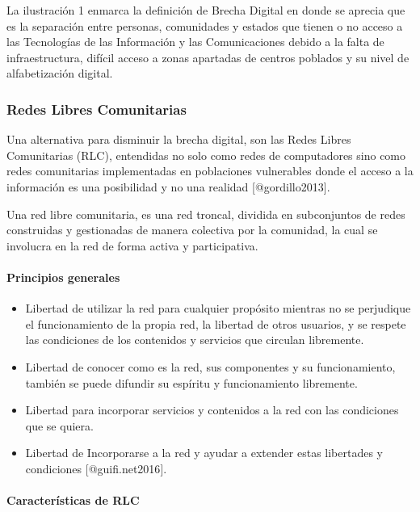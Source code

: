 \documentclass[]{article}
\let\oldparagraph\paragraph
\renewcommand{\paragraph}[1]{\oldparagraph{#1}\mbox{}}
\begin{document}
La ilustración 1 enmarca la definición de Brecha Digital en donde se
aprecia que es la separación entre personas, comunidades y estados que
tienen o no acceso a las Tecnologías de las Información y las
Comunicaciones debido a la falta de infraestructura, difícil acceso a
zonas apartadas de centros poblados y su nivel de alfabetización
digital.

\subsubsection{Redes Libres
Comunitarias}\label{redes-libres-comunitarias}

Una alternativa para disminuir la brecha digital, son las Redes Libres
Comunitarias (RLC), entendidas no solo como redes de computadores sino
como redes comunitarias implementadas en poblaciones vulnerables donde
el acceso a la información es una posibilidad y no una realidad
{[}@gordillo2013{]}.

Una red libre comunitaria, es una red troncal, dividida en subconjuntos
de redes construidas y gestionadas de manera colectiva por la comunidad,
la cual se involucra en la red de forma activa y participativa.

\paragraph{Principios generales}\label{principios-generales}

\begin{itemize}
\item
  Libertad de utilizar la red para cualquier propósito mientras no se
  perjudique el funcionamiento de la propia red, la libertad de otros
  usuarios, y se respete las condiciones de los contenidos y servicios
  que circulan libremente.~
\item
  Libertad de conocer como es la red, sus componentes y su
  funcionamiento, también se puede difundir su espíritu y funcionamiento
  libremente.
\item
  Libertad para incorporar servicios y contenidos a la red con las
  condiciones que se quiera.
\item
  Libertad de Incorporarse a la red y ayudar a extender estas libertades
  y condiciones {[}@guifi.net2016{]}.~
\end{itemize}

\paragraph{Características de RLC}\label{caracteruxedsticas-de-rlc}
\end{document}
